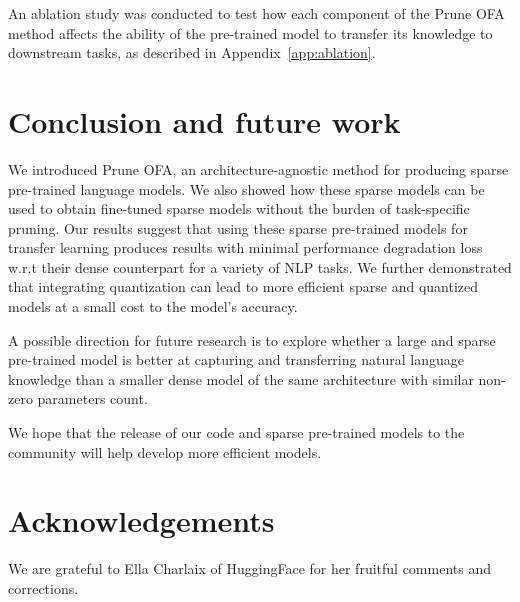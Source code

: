 \documentclass{article}
\begin{document}
An ablation study was conducted to test how each component of the Prune OFA method affects the ability of the pre-trained model to transfer its knowledge to downstream tasks, as described in Appendix~\ref{app:ablation}.

\section{Conclusion and future work}
\label{sec:conclusions}
We introduced Prune OFA, an architecture-agnostic method for producing sparse pre-trained language models.
We also showed how these sparse models can be used to obtain fine-tuned sparse models without the burden of task-specific pruning.
Our results suggest that using these sparse pre-trained models for transfer learning produces results with minimal performance degradation loss w.r.t their dense counterpart for a variety of NLP tasks.
We further demonstrated that integrating quantization can lead to more efficient sparse and quantized models at a small cost to the model's accuracy.

A possible direction for future research is to explore whether a large and sparse pre-trained model is better at capturing and transferring natural language knowledge than a smaller dense model of the same architecture with similar non-zero parameters count.

We hope that the release of our code and sparse pre-trained models to the community will help develop more efficient models.

\section{Acknowledgements}
We are grateful to Ella Charlaix of HuggingFace for her fruitful comments and corrections.























\appendix
\end{document}
